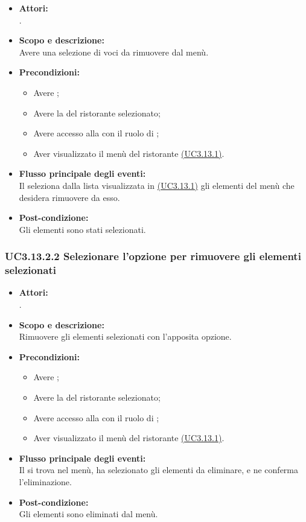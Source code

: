\begin{itemize}
	\item \textbf{Attori:}
	\\.
	\item \textbf{Scopo e descrizione:} 
	\\Avere una selezione di voci da rimuovere dal menù.
	\item \textbf{Precondizioni:}
	\begin{itemize}
		\item Avere ;
		\item Avere la  del ristorante selezionato;
		\item Avere accesso alla  con il ruolo di ;
		\item Aver visualizzato il menù del ristorante \hyperref[UC3.13.1]{(UC3.13.1)}.
	\end{itemize}
	\item \textbf{Flusso principale degli eventi:}
	\\Il {} seleziona dalla lista visualizzata in \hyperref[UC3.13.1]{(UC3.13.1)} gli elementi del menù che desidera rimuovere da esso.
	\item \textbf{Post-condizione:}
	\\Gli elementi sono stati selezionati.
\end{itemize}

\subsubsection{UC3.13.2.2 Selezionare l'opzione per rimuovere gli elementi selezionati} \label{UC3.13.2.2}

\begin{itemize}
	\item \textbf{Attori:}
	\\.
	\item \textbf{Scopo e descrizione:} 
	\\Rimuovere gli elementi selezionati con l'apposita opzione.
	\item \textbf{Precondizioni:}
	\begin{itemize}
		\item Avere ;
		\item Avere la  del ristorante selezionato;
		\item Avere accesso alla  con il ruolo di ;
		\item Aver visualizzato il menù del ristorante \hyperref[UC3.13.1]{(UC3.13.1)}.
	\end{itemize}
	\item \textbf{Flusso principale degli eventi:}
	\\Il {} si trova nel menù, ha selezionato gli elementi da eliminare, e ne conferma l'eliminazione.
	\item \textbf{Post-condizione:}
	\\Gli elementi sono eliminati dal menù.
\end{itemize}

